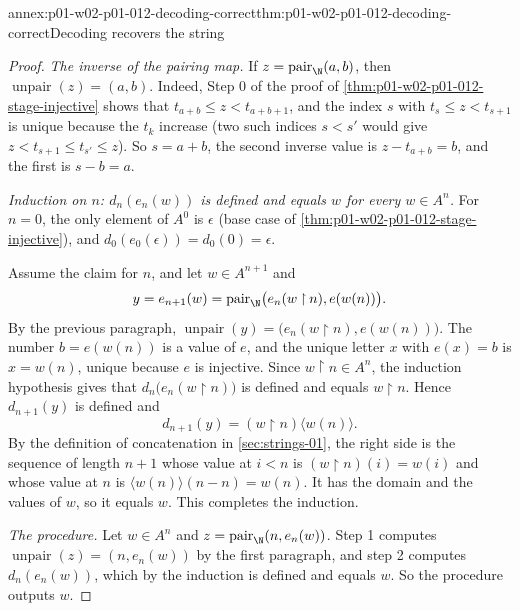 \begin{annexitem}{annex:p01-w02-p01-012-decoding-correct}{thm:p01-w02-p01-012-decoding-correct}{Decoding recovers the string}
\begin{proof}
\emph{The inverse of the pairing map.} If \(z=\operatorname{pair}_{\N}(a,b)\),
then \(\operatorname{unpair}(z)=(a,b)\). Indeed, Step 0 of the proof of
\cref{thm:p01-w02-p01-012-stage-injective} shows that
\(t_{a+b}\leq z<t_{a+b+1}\), and the index \(s\) with \(t_s\leq z<t_{s+1}\)
is unique because the \(t_k\) increase (two such indices \(s<s'\) would give
\(z<t_{s+1}\leq t_{s'}\leq z\)). So \(s=a+b\), the second inverse value is
\(z-t_{a+b}=b\), and the first is \(s-b=a\).

\emph{Induction on \(n\): \(d_n(e_n(w))\) is defined and equals \(w\) for
every \(w\in A^n\).} For \(n=0\), the only element of \(A^0\) is \(\epsilon\)
(base case of \cref{thm:p01-w02-p01-012-stage-injective}), and
\(d_0(e_0(\epsilon))=d_0(0)=\epsilon\).

Assume the claim for \(n\), and let \(w\in A^{n+1}\) and
\[
  y=e_{n+1}(w)=\operatorname{pair}_{\N}\bigl(e_n(w\mathbin{\upharpoonright}n),
  e(w(n))\bigr).
\]
By the previous paragraph,
\(\operatorname{unpair}(y)=\bigl(e_n(w\mathbin{\upharpoonright}n),
e(w(n))\bigr)\). The number \(b=e(w(n))\) is a value of \(e\), and the unique
letter \(x\) with \(e(x)=b\) is \(x=w(n)\), unique because \(e\) is
injective. Since \(w\mathbin{\upharpoonright}n\in A^n\), the induction
hypothesis gives that
\(d_n\bigl(e_n(w\mathbin{\upharpoonright}n)\bigr)\) is defined and equals
\(w\mathbin{\upharpoonright}n\). Hence \(d_{n+1}(y)\) is defined and
\[
  d_{n+1}(y)=(w\mathbin{\upharpoonright}n)\langle w(n)\rangle .
\]
By the definition of concatenation in \cref{sec:strings-01}, the right side
is the sequence of length \(n+1\) whose value at \(i<n\) is
\((w\mathbin{\upharpoonright}n)(i)=w(i)\) and whose value at \(n\) is
\(\langle w(n)\rangle(n-n)=w(n)\). It has the domain and the values of \(w\),
so it equals \(w\). This completes the induction.

\emph{The procedure.} Let \(w\in A^n\) and
\(z=\operatorname{pair}_{\N}(n,e_n(w))\). Step 1 computes
\(\operatorname{unpair}(z)=(n,e_n(w))\) by the first paragraph, and step 2
computes \(d_n(e_n(w))\), which by the induction is defined and equals \(w\).
So the procedure outputs \(w\).
\end{proof}
\end{annexitem}

